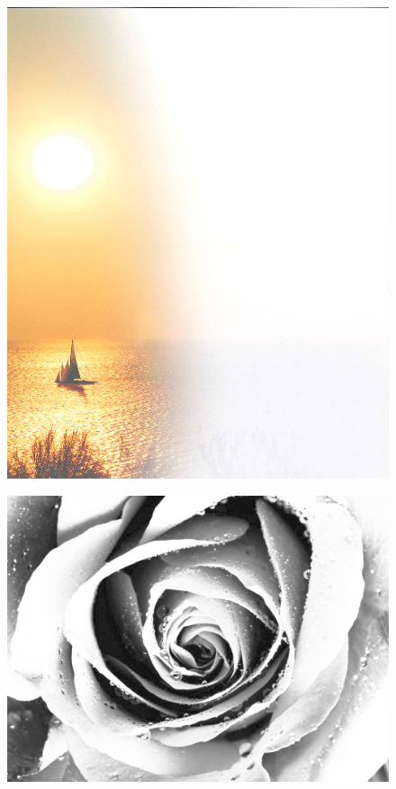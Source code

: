 \documentclass[ngerman,a4paper,11pt]{scrreprt}
\begin{document}
\begin{figure}[H]
\centering
\includegraphics[width=\textwidth,height=.8\textheight]{Bilder/Bilder/./750_0010_7431_Hintergrund_Sehnsucht_Todesanzeige_1.png}
\end{figure}

\begin{figure}[H]
\centering
\includegraphics[width=\textwidth,height=.8\textheight]{Bilder/Bilder/./750_0010_8140_750_0010_8137_rose_02_SW_hell.png}
\end{figure}
\end{document}

